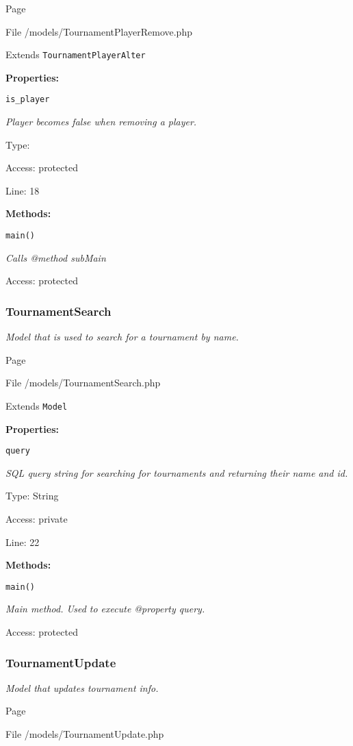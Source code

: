 Page \pageref{TournamentPlayerRemove.php}

File /models/TournamentPlayerRemove.php

Extends \texttt{TournamentPlayerAlter}

\textbf{Properties:}

\texttt{is\_player}

{\scriptsize
\textit{Player becomes false when removing a player.}

Type: 

Access: protected

Line: 18

}
\textbf{Methods:}

\texttt{main()}

{\scriptsize
\textit{Calls @method subMain}

Access: protected

}

\subsubsection{TournamentSearch}
\textit{Model that is used to search for a tournament by name.}

Page \pageref{TournamentSearch.php}

File /models/TournamentSearch.php

Extends \texttt{Model}

\textbf{Properties:}

\texttt{query}

{\scriptsize
\textit{SQL query string for searching for tournaments and returning their name and id.}

Type: String

Access: private

Line: 22

}
\textbf{Methods:}

\texttt{main()}

{\scriptsize
\textit{Main method.
Used to execute @property query.}

Access: protected

}

\subsubsection{TournamentUpdate}
\textit{Model that updates tournament info.}

Page \pageref{TournamentUpdate.php}

File /models/TournamentUpdate.php

